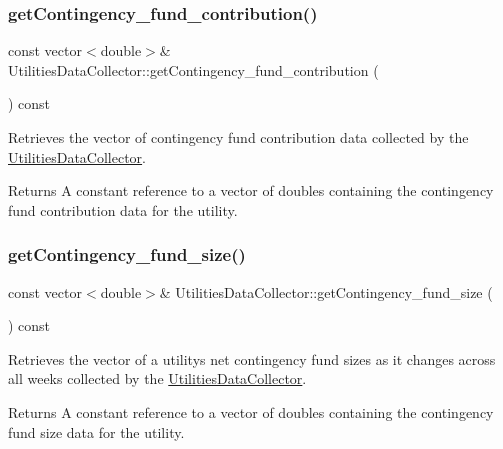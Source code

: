 \subsubsection{\texorpdfstring{get\+Contingency\+\_\+fund\+\_\+contribution()}{getContingency\_fund\_contribution()}}
{\footnotesize\ttfamily const vector$<$double$>$\& Utilities\+Data\+Collector\+::get\+Contingency\+\_\+fund\+\_\+contribution (\begin{DoxyParamCaption}{ }\end{DoxyParamCaption}) const}



Retrieves the vector of contingency fund contribution data collected by the {\ttfamily \mbox{\hyperlink{classUtilitiesDataCollector}{Utilities\+Data\+Collector}}}. 

\begin{DoxyReturn}{Returns}
A constant reference to a vector of doubles containing the contingency fund contribution data for the utility. 
\end{DoxyReturn}
\mbox{\label{classUtilitiesDataCollector_a2fa923f7d2df2a31a20294279572aeb6}} 
\subsubsection{\texorpdfstring{get\+Contingency\+\_\+fund\+\_\+size()}{getContingency\_fund\_size()}}
{\footnotesize\ttfamily const vector$<$double$>$\& Utilities\+Data\+Collector\+::get\+Contingency\+\_\+fund\+\_\+size (\begin{DoxyParamCaption}{ }\end{DoxyParamCaption}) const}



Retrieves the vector of a utility\textquotesingle{}s net contingency fund sizes as it changes across all weeks collected by the {\ttfamily \mbox{\hyperlink{classUtilitiesDataCollector}{Utilities\+Data\+Collector}}}. 

\begin{DoxyReturn}{Returns}
A constant reference to a vector of doubles containing the contingency fund size data for the utility. 
\end{DoxyReturn}
\mbox{\label{classUtilitiesDataCollector_a13635135acfe49ec8eb0b587af41c9f1}} 
